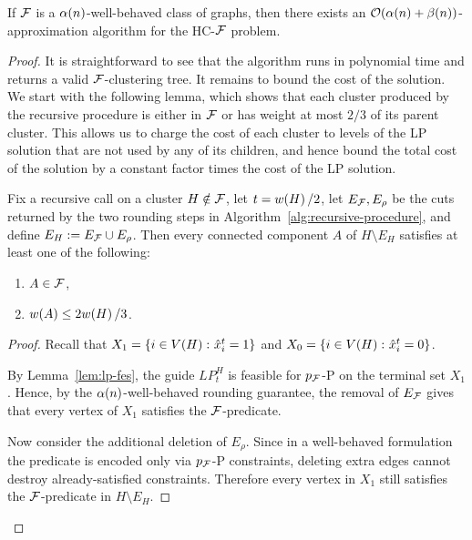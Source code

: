     \begin{theorem}\label{thm:main-approximation}
        If $\mathcal{F}$ is a $\alpha\mathopen{}\left( n \right)$-well-behaved class of graphs, then there exists an $\mathcal{O}\mathopen{}\left( \alpha\mathopen{}\left( n \right)+\beta\mathopen{}\left( n \right) \right)$-approximation algorithm for the \textsc{HC-$\mathcal{F}$} problem.
    \end{theorem}
    \begin{proof}
        It is straightforward to see that the algorithm runs in polynomial time and returns a valid $\mathcal{F}$-clustering tree. It remains to bound the cost of the solution. We start with the following lemma, which shows that each cluster produced by the recursive procedure is either in $\mathcal{F}$ or has weight at most $2/3$ of its parent cluster. This allows us to charge the cost of each cluster to levels of the \textsc{LP} solution that are not used by any of its children, and hence bound the total cost of the solution by a constant factor times the cost of the \textsc{LP} solution.
    \begin{lemma}\label{lem:child-cluster-valid-or-small}
        Fix a recursive call on a cluster $H\notin\mathcal{F}$, let $t=w\mathopen{}\left( H \right)/2$, let $E_{\mathcal{F}},E_{\rho}$ be the cuts returned by the two rounding steps in Algorithm~\ref{alg:recursive-procedure}, and define $E_H:=E_{\mathcal{F}}\cup E_{\rho}$. Then every connected component $A$ of $H\setminus E_H$ satisfies at least one of the following:
        \begin{enumerate}
            \item $A\in \mathcal{F}$,
            \item $w\mathopen{}\left( A \right)\leq 2w\mathopen{}\left( H \right)/3$.
        \end{enumerate}
    \end{lemma}
    \begin{proof}
        Recall that $X_1=\mathopen{}\left\{ i\in V\mathopen{}\left( H \right)\colon \hat x_i^t=1 \right\}$ and $X_0=\mathopen{}\left\{ i\in V\mathopen{}\left( H \right)\colon \hat x_i^t=0 \right\}$.

        By Lemma~\ref{lem:lp-fes}, the guide $LP_t^H$ is feasible for \textsc{$p_{\mathcal{F}}$-P} on the terminal set $X_1$. Hence, by the $\alpha\mathopen{}\left( n \right)$-well-behaved rounding guarantee, the removal of $E_{\mathcal{F}}$ gives that every vertex of $X_1$ satisfies the $\mathcal{F}$-predicate.

        Now consider the additional deletion of $E_{\rho}$. Since in a well-behaved formulation the predicate is encoded only via $p_{\mathcal{F}}$-P constraints, deleting extra edges cannot destroy already-satisfied constraints. Therefore every vertex in $X_1$ still satisfies the $\mathcal{F}$-predicate in $H\setminus E_H$.


\end{proof}
\end{proof}
